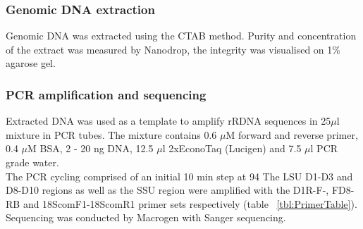 \documentclass[12pt]{article}
\begin{document}
\subsubsection{Genomic DNA extraction}
Genomic DNA was extracted using the CTAB method. Purity and concentration of the extract was measured by Nanodrop, the integrity was visualised on 1\% agarose gel.

\subsubsection{PCR amplification and sequencing}
Extracted DNA was used as a template to amplify rRDNA sequences in 25$\mu$l mixture in PCR tubes. The mixture contains 0.6 $\mu$M forward and reverse primer, 0.4 $\mu$M BSA, 2 - 20 ng DNA, 12.5 $\mu$l 2xEconoTaq (Lucigen) and 7.5 $\mu$l PCR grade water.\\
The PCR cycling comprised of an initial 10 min step at 94
The LSU D1-D3  and D8-D10 regions as well as the SSU region were amplified with the D1R-F-, FD8-RB and 18ScomF1-18ScomR1 primer sets respectively (table ~\ref{tbl:PrimerTable}).\\
Sequencing was conducted by Macrogen with Sanger sequencing.
\FloatBarrier
\end{document}
